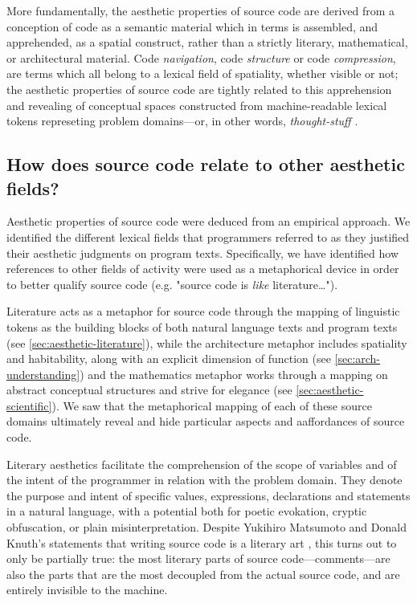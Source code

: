 More fundamentally, the aesthetic properties of source code are derived from a conception of code as a semantic material which in terms is assembled, and apprehended, as a spatial construct, rather than a strictly literary, mathematical, or architectural material. Code \emph{navigation}, code \emph{structure} or code \emph{compression}, are terms which all belong to a lexical field of spatiality, whether visible or not; the aesthetic properties of source code are tightly related to this apprehension and revealing of conceptual spaces constructed from machine-readable lexical tokens represeting problem domains—or, in other words, \emph{thought-stuff} \citep{brooksjr_mythical_1975}.

\subsection{How does source code relate to other aesthetic fields?}
\label{subsec:conclusion-rq-2}

Aesthetic properties of source code were deduced from an empirical approach. We identified the different lexical fields that programmers referred to as they justified their aesthetic judgments on program texts. Specifically, we have identified how references to other fields of activity were used as a metaphorical device in order to better qualify source code (e.g. "source code is \emph{like} literature\dots").

Literature acts as a metaphor for source code through the mapping of linguistic tokens as the building blocks of both natural language texts and program texts (see \ref{sec:aesthetic-literature}), while the architecture metaphor includes spatiality and habitability, along with an explicit dimension of function (see \ref{sec:arch-understanding}) and the mathematics metaphor works through a mapping on abstract conceptual structures and strive for elegance (see \ref{sec:aesthetic-scientific}). We saw that the metaphorical mapping of each of these source domains ultimately reveal and hide particular aspects and aaffordances of source code.

Literary aesthetics facilitate the comprehension of the scope of variables and of the intent of the programmer in relation with the problem domain. They denote the purpose and intent of specific values, expressions, declarations and statements in a natural language, with a potential both for poetic evokation, cryptic obfuscation, or plain misinterpretation. Despite Yukihiro Matsumoto and Donald Knuth's statements that writing source code is a literary art \citep{knuth_literate_1984,matsumoto_treating_2007}, this turns out to only be partially true: the most literary parts of source code—comments—are also the parts that are the most decoupled from the actual source code, and are entirely invisible to the machine.

